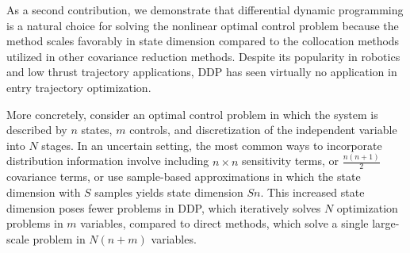 \documentclass[journal ]{new-aiaa}
\begin{document}
As a second contribution, we demonstrate that differential dynamic programming is a natural choice for solving the nonlinear optimal control problem because the method scales favorably in state dimension compared to the collocation methods utilized in other covariance reduction methods. Despite its popularity in robotics and low thrust trajectory applications, DDP has seen virtually no application in entry trajectory optimization. 

More concretely, consider an optimal control problem in which the system is described by $n$ states, $m$ controls, and discretization of the independent variable into $N$ stages. In an uncertain setting, the most common ways to incorporate distribution information involve including $n\times n$ sensitivity terms, or $\frac{n(n+1)}{2}$ covariance terms, or use sample-based approximations in which the state dimension with $S$ samples yields state dimension $Sn$. This increased state dimension poses fewer problems in DDP, which iteratively solves $N$ optimization problems in $m$ variables, compared to direct methods, which solve a single large-scale problem in $N(n+m)$ variables.



\end{document}
